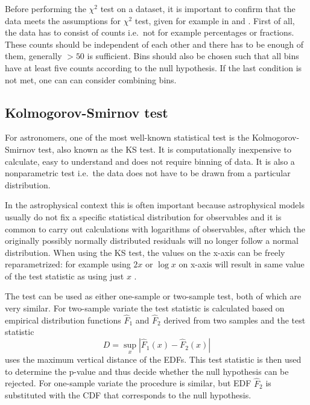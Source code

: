 \documentclass[english, oneside]{HYgradu}
\begin{document}
Before performing the $\chi^2$ test on a dataset, it is important to confirm that the data meets the assumptions for $\chi^2$ test, given for example in \citep{bock2010stats} and \citep{htk}. First of all, the data has to consist of counts i.e.\ not for example percentages or fractions. These counts should be independent of each other and there has to be enough of them, generally $>50$ is sufficient. Bins should also be chosen such that all bins have at least five counts according to the null hypothesis. If the last condition is not met, one can can consider combining bins. 


\subsection{Kolmogorov-Smirnov test} \label{sect:ks}
For astronomers, one of the most well-known statistical test is the Kolmogorov-Smirnov test, also known as the KS test. It is computationally inexpensive to calculate, easy to understand and does not require binning of data. It is also a nonparametric test i.e.\ the data does not have to be drawn from a particular distribution.

In the astrophysical context this is often important because astrophysical models usually do not fix a specific statistical distribution for observables and it is common to carry out calculations with logarithms of observables, after which the originally possibly normally distributed residuals  will no longer follow a normal distribution. When using the KS test, the values on the x-axis can be freely reparametrized: for example using $2x$ or $\log x$ on x-axis will result in same value of the test statistic as using just $x$ \citep{press2007numerical}.

The test can be used as either one-sample or two-sample test, both of which are very similar. For two-sample variate the test statistic is calculated based on empirical distribution functions $\hat{F}_1$ and $\hat{F}_2$ derived from two samples and the test statistic
\begin{equation}
	D = \sup_{x} |\hat{F}_1(x) - \hat{F}_2(x)|
\end{equation}
uses the maximum vertical distance of the EDFs. This test statistic is then used to determine the p-value and thus decide whether the null hypothesis can be rejected. For one-sample variate the procedure is similar, but EDF $\hat{F}_2$ is substituted with the CDF that corresponds to the null hypothesis.
\end{document}
